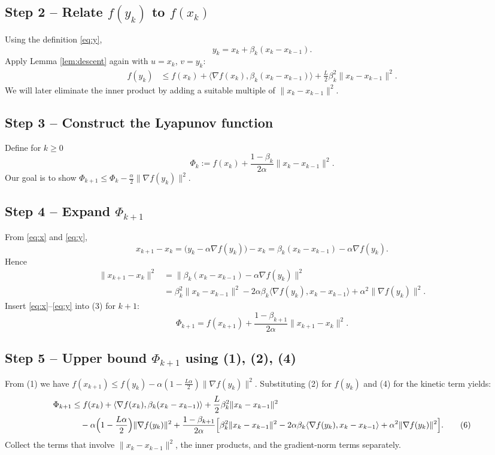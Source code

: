 \documentclass{article}
\begin{document}
\subsection*{Step 2 – Relate $f(y_k)$ to $f(x_k)$}
Using the definition \eqref{eq:y},
\[
y_k = x_k + \beta_k (x_k-x_{k-1}).
\]
Apply Lemma \ref{lem:descent} again with $u=x_k$, $v=y_k$:
\begin{align}
f(y_k) &\le f(x_k) + \langle \nabla f(x_k),\beta_k (x_k-x_{k-1})\rangle
+\frac{L}{2}\beta_k^{2}\|x_k-x_{k-1}\|^{2}. \tag{2}
\end{align}
We will later eliminate the inner product by adding a suitable multiple of $\|x_k-x_{k-1}\|^{2}$.

\subsection*{Step 3 – Construct the Lyapunov function}
Define for $k\ge0$
\[
\Phi_k := f(x_k)+\frac{1-\beta_k}{2\alpha}\|x_k-x_{k-1}\|^{2}.
\tag{3}
\]
Our goal is to show $\Phi_{k+1}\le \Phi_k-\frac{\alpha}{2}\|\nabla f(y_k)\|^{2}$.

\subsection*{Step 4 – Expand $\Phi_{k+1}$}
From \eqref{eq:x} and \eqref{eq:y},
\[
x_{k+1}-x_k = \bigl(y_k-\alpha\nabla f(y_k)\bigr)-x_k
= \beta_k (x_k-x_{k-1}) - \alpha\nabla f(y_k).
\]
Hence
\begin{align}
\|x_{k+1}-x_k\|^{2}
&= \big\|\beta_k (x_k-x_{k-1}) - \alpha\nabla f(y_k)\big\|^{2} \nonumber\\
&= \beta_k^{2}\|x_k-x_{k-1}\|^{2}
-2\alpha\beta_k\langle\nabla f(y_k),x_k-x_{k-1}\rangle
+\alpha^{2}\|\nabla f(y_k)\|^{2}.
\tag{4}
\end{align}
Insert \eqref{eq:x}–\eqref{eq:y} into (3) for $k+1$:
\[
\Phi_{k+1}=f(x_{k+1})+\frac{1-\beta_{k+1}}{2\alpha}\|x_{k+1}-x_k\|^{2}.
\tag{5}
\]

\subsection*{Step 5 – Upper bound $\Phi_{k+1}$ using (1), (2), (4)}
From (1) we have $f(x_{k+1})\le f(y_k)-\alpha(1-\tfrac{L\alpha}{2})\|\nabla f(y_k)\|^{2}$.  
Substituting (2) for $f(y_k)$ and (4) for the kinetic term yields:
\begin{align}
\Phi_{k+1}
&\le f(x_k) + \langle \nabla f(x_k),\beta_k (x_k-x_{k-1})\rangle
+\frac{L}{2}\beta_k^{2}\|x_k-x_{k-1}\|^{2} \nonumber\\
&\quad -\alpha\Bigl(1-\frac{L\alpha}{2}\Bigr)\|\nabla f(y_k)\|^{2}
+ \frac{1-\beta_{k+1}}{2\alpha}\Bigl[
\beta_k^{2}\|x_k-x_{k-1}\|^{2}
-2\alpha\beta_k\langle\nabla f(y_k),x_k-x_{k-1}\rangle
+\alpha^{2}\|\nabla f(y_k)\|^{2}
\Bigr].
\tag{6}
\end{align}
Collect the terms that involve $\|x_k-x_{k-1}\|^{2}$, the inner products, and the gradient‐norm terms separately.
\end{document}
